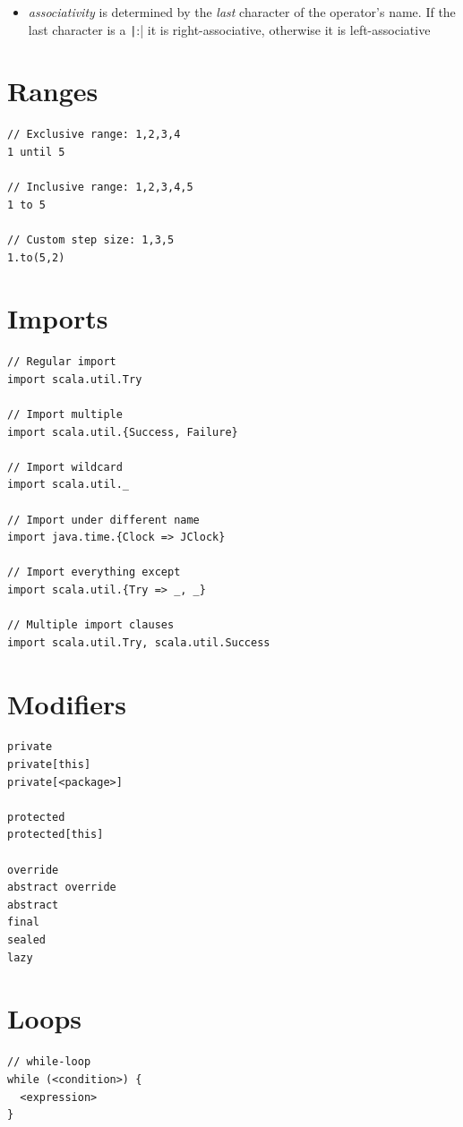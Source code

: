 \documentclass[10pt,landscape,a4paper]{article}
\begin{document}
\begin{multicols*}{4}
\begin{itemize}
\begin{tabular}{l | l}
  \end{tabular}
\item \textit{associativity} is determined by the \textit{last}
  character of the operator's name.  If the last character is a
  \texttt|:| it is right-associative, otherwise it is
  left-associative
\end{itemize}

\section{Ranges}

\begin{verbatim}
// Exclusive range: 1,2,3,4
1 until 5

// Inclusive range: 1,2,3,4,5
1 to 5

// Custom step size: 1,3,5
1.to(5,2)

\end{verbatim}

\section{Imports}

\begin{verbatim}
// Regular import
import scala.util.Try

// Import multiple
import scala.util.{Success, Failure}

// Import wildcard
import scala.util._

// Import under different name
import java.time.{Clock => JClock}

// Import everything except
import scala.util.{Try => _, _}

// Multiple import clauses
import scala.util.Try, scala.util.Success
\end{verbatim}

\section{Modifiers}
\begin{verbatim}
private
private[this]
private[<package>]

protected
protected[this]

override
abstract override
abstract
final
sealed
lazy
\end{verbatim}

\section{Loops}
\begin{verbatim}
// while-loop
while (<condition>) {
  <expression>
}


\end{verbatim}
\end{multicols*}
\end{document}
